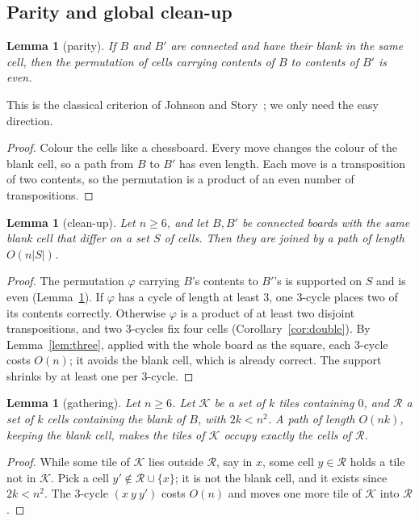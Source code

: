 \documentclass[11pt]{amsart}
\newtheorem{lemma}[theorem]{Lemma}
\theoremstyle{definition}
\begin{document}
\subsection{Parity and global clean-up}

\begin{lemma}[parity]\label{lem:parity}
If $B$ and $B'$ are connected and have their blank in the same cell, then the permutation
of cells carrying contents of $B$ to contents of $B'$ is even.
\end{lemma}

This is the classical criterion of Johnson and Story~\cite{johnsonstory}; we only need the easy direction.
\begin{proof}
Colour the cells like a chessboard. Every move changes the colour of the blank cell,
so a path from $B$ to $B'$ has even length. Each move is a transposition of two
contents, so the permutation is a product of an even number of transpositions.
\end{proof}

\begin{lemma}[clean-up]\label{lem:cleanup}
Let $n\ge6$, and let $B,B'$ be connected boards with the same blank cell that differ on a set
$S$ of cells. Then they are joined by a path of length $O(n|S|)$.
\end{lemma}

\begin{proof}
The permutation $\varphi$ carrying $B$'s contents to $B'$'s is supported on $S$ and is
even (Lemma~\ref{lem:parity}). If $\varphi$ has a cycle of length at least $3$, one $3$-cycle
places two of its contents correctly. Otherwise $\varphi$ is a product of at least two disjoint
transpositions, and two $3$-cycles fix four cells (Corollary~\ref{cor:double}). By Lemma~\ref{lem:three},
applied with the whole board as the square, each $3$-cycle costs $O(n)$; it avoids the blank cell, which is
already correct. The support shrinks by at least one per $3$-cycle.
\end{proof}

\begin{lemma}[gathering]\label{lem:gather}
Let $n\ge6$. Let $\mathcal K$ be a set of $k$ tiles containing $0$, and $\mathcal R$ a set of $k$ cells
containing the blank of $B$, with $2k<n^2$. A path of length $O(nk)$, keeping the blank cell, makes
the tiles of $\mathcal K$ occupy exactly the cells of $\mathcal R$.
\end{lemma}

\begin{proof}
While some tile of $\mathcal K$ lies outside $\mathcal R$, say in $x$, some cell $y\in \mathcal R$
holds a tile not in $\mathcal K$. Pick a cell $y'\notin \mathcal R\cup\{x\}$; it is not the blank cell, and it exists since $2k<n^2$.
The $3$-cycle $(x\ y\ y')$ costs $O(n)$ and moves one more tile of $\mathcal K$ into $\mathcal R$.
\end{proof}
\end{document}
